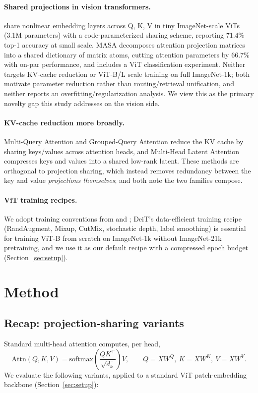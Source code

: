 \documentclass[11pt]{article}
\newcommand{\wq}{W^{Q}}
\newcommand{\wk}{W^{K}}
\newcommand{\wv}{W^{V}}
\begin{document}
\paragraph{Shared projections in vision transformers.}
\citet{lee2021rethinking} share nonlinear embedding layers across Q, K, V
in tiny ImageNet-scale ViTs (3.1M parameters) with a code-parameterized
sharing scheme, reporting 71.4\% top-1 accuracy at small scale. MASA
\citep{masa2025} decomposes attention projection matrices into a shared
dictionary of matrix atoms, cutting attention parameters by 66.7\% with
on-par performance, and includes a ViT classification experiment. Neither
targets KV-cache reduction or ViT-B/L scale training on full ImageNet-1k;
both motivate parameter reduction rather than routing/retrieval unification,
and neither reports an overfitting/regularization analysis. We view this as
the primary novelty gap this study addresses on the vision side.

\paragraph{KV-cache reduction more broadly.}
Multi-Query Attention \citep{shazeer2019mqa} and Grouped-Query Attention
\citep{ainslie2023gqa} reduce the KV cache by sharing keys/values across
attention heads, and Multi-Head Latent Attention \citep{deepseek2024mla}
compresses keys and values into a shared low-rank latent. These methods are
orthogonal to projection sharing, which instead removes redundancy between
the key and value \emph{projections themselves}; \citet{kayyam2026three} and
\citet{gao2026keyless} both note the two families compose.

\paragraph{ViT training recipes.}
We adopt training conventions from \citet{dosovitskiy2021vit} and
\citet{touvron2021deit}; DeiT's data-efficient training recipe
(RandAugment, Mixup, CutMix, stochastic depth, label smoothing) is
essential for training ViT-B from scratch on ImageNet-1k without
ImageNet-21k pretraining, and we use it as our default recipe with a
compressed epoch budget (Section~\ref{sec:setup}).

\section{Method}
\label{sec:method}

\subsection{Recap: projection-sharing variants}
Standard multi-head attention computes, per head,
\begin{equation}
    \mathrm{Attn}(Q,K,V) = \mathrm{softmax}\!\left(\frac{QK^\top}{\sqrt{d_k}}\right)V,
    \qquad Q=X\wq,\ K=X\wk,\ V=X\wv .
\end{equation}
We evaluate the following variants, applied to a standard ViT patch-embedding
backbone (Section~\ref{sec:setup}):
\end{document}
